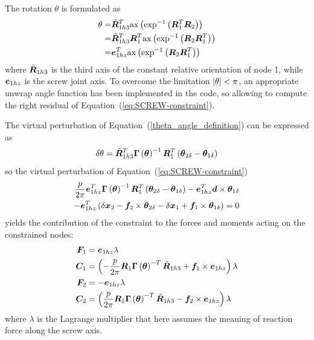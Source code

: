 The rotation $\theta$ is formulated as
\begin{align}
        \label{theta_angle_definition}
	\nonumber
	\theta =& \tilde{\bm{R}}_{1h3}^T \mathrm{ax}\left( \mathrm{exp}^{-1}\left( \bm{R}_1^T \bm{R}_2 \right) \right) \\
                 \nonumber
	       =& \tilde{\bm{R}}_{1h3}^T \bm{R}_1^T\mathrm{ax}\left( \mathrm{exp}^{-1}\left( \bm{R}_2 \bm{R}_1^T \right) \right) \\
               =& \bm{e}_{1hz}^T\mathrm{ax}\left( \mathrm{exp}^{-1}\left( \bm{R}_2 \bm{R}_1^T \right) \right)
\end{align}
where $\tilde{\bm{R}}_{1h3}$ is the third axis of the constant 
relative orientation of node 1, while $\bm{e}_{1hz}$ is the screw joint axis. 
To overcome the limitation $\left| \theta \right|<\pi$, an appropriate
unwrap angle function has been implemented in the code, so allowing to
compute the right residual of Equation~(\ref{eq:SCREW-constraint}).  

The virtual perturbation of Equation~(\ref{theta_angle_definition})
can be expressed as
\begin{equation}
	\delta\theta = \tilde{\bm{R}}^T_{1h3}\bm{\Gamma}\left( \bm{\theta} \right)^{-1}\bm{R}^T_1\left( \bm{\theta}_{2\delta} - \bm{\theta}_{1\delta} \right)
\end{equation}
so the virtual perturbation of Equation~(\ref{eq:SCREW-constraint})
\begin{align}
        \nonumber
        \frac{p}{2\pi}\bm{e}^T_{1hz}\bm{\Gamma}\left( \bm{\theta} \right)^{-1}\bm{R}^T_1 \left( \bm{\theta}_{2\delta} - \bm{\theta}_{1\delta} \right)
        - \bm{e}^T_{1hz}\bm{d} \times \bm{\theta}_{1\delta} &\\
        - \bm{e}^T_{1hz} \left( \delta\bm{x}_2 - \bm{f}_2 \times \bm{\theta}_{2\delta} - \delta\bm{x}_1 + \bm{f}_1\times \bm{\theta}_{1\delta} \right) = 0 
        \label{eq:virtual_perturbation_const_eq}
\end{align}
yields the contribution of the constraint to the forces and moments
acting on the constrained nodes:
\begin{align}
         \bm{F}_1 &= \bm{e}_{1hz} \lambda \\ 
	 \bm{C}_1 &= \left(  - \frac{p}{2\pi}\bm{R}_1\bm{\Gamma}\left( \bm{\theta} \right)^{-T}\tilde{\bm{R}}_{1h3} +
                           \bm{f}_1 \times \bm{e}_{1hz}  \right) \lambda 
	 \label{eq:screw_couple_1}	  
	 \\
         \bm{F}_2 &= -\bm{e}_{1hz} \lambda \\
	 \bm{C}_2 &= \left(  \frac{p}{2\pi}\bm{R}_1\bm{\Gamma}\left( \bm{\theta} \right)^{-T}\tilde{\bm{R}}_{1h3} - \bm{f}_2 \times \bm{e}_{1hz}  \right) \lambda 
	 \label{eq:screw_couple_2}	  
\end{align}
where $\lambda$ is the Lagrange multiplier that here assumes the meaning
of reaction force along the screw axis.

